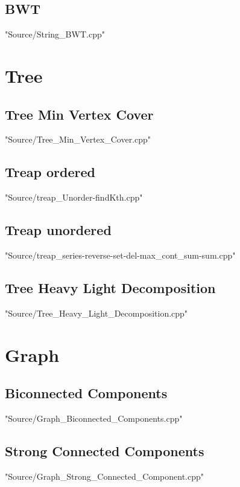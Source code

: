 \documentclass [10pt,twocolumn,oneside]{article}
\begin{document}
\subsection{BWT}
 {"Source/String_BWT.cpp"}




\newpage
\section{Tree}
\subsection{Tree Min Vertex Cover}
 {"Source/Tree_Min_Vertex_Cover.cpp"}

\subsection{Treap ordered}
 {"Source/treap_Unorder-findKth.cpp"}

\subsection{Treap unordered}
 {"Source/treap_series-reverse-set-del-max_cont_sum-sum.cpp"}

\subsection{Tree Heavy Light Decomposition}
 {"Source/Tree_Heavy_Light_Decomposition.cpp"}




\newpage
\section{Graph}
\subsection{Biconnected Components}
 {"Source/Graph_Biconnected_Components.cpp"}

\subsection{Strong Connected Components}
 {"Source/Graph_Strong_Connected_Component.cpp"}
\end{document}
